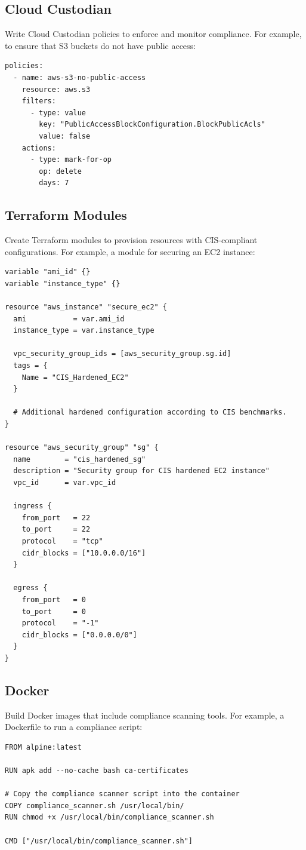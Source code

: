\documentclass[12pt]{article}
\begin{document}
\subsection{Cloud Custodian}
Write Cloud Custodian policies to enforce and monitor compliance. For example, to ensure that S3 buckets do not have public access:
\begin{verbatim}
policies:
  - name: aws-s3-no-public-access
    resource: aws.s3
    filters:
      - type: value
        key: "PublicAccessBlockConfiguration.BlockPublicAcls"
        value: false
    actions:
      - type: mark-for-op
        op: delete
        days: 7
\end{verbatim}

\subsection{Terraform Modules}
Create Terraform modules to provision resources with CIS-compliant configurations. For example, a module for securing an EC2 instance:
\begin{verbatim}
variable "ami_id" {}
variable "instance_type" {}

resource "aws_instance" "secure_ec2" {
  ami           = var.ami_id
  instance_type = var.instance_type

  vpc_security_group_ids = [aws_security_group.sg.id]
  tags = {
    Name = "CIS_Hardened_EC2"
  }

  # Additional hardened configuration according to CIS benchmarks.
}

resource "aws_security_group" "sg" {
  name        = "cis_hardened_sg"
  description = "Security group for CIS hardened EC2 instance"
  vpc_id      = var.vpc_id

  ingress {
    from_port   = 22
    to_port     = 22
    protocol    = "tcp"
    cidr_blocks = ["10.0.0.0/16"]
  }

  egress {
    from_port   = 0
    to_port     = 0
    protocol    = "-1"
    cidr_blocks = ["0.0.0.0/0"]
  }
}
\end{verbatim}

\subsection{Docker}
Build Docker images that include compliance scanning tools. For example, a Dockerfile to run a compliance script:
\begin{verbatim}
FROM alpine:latest

RUN apk add --no-cache bash ca-certificates

# Copy the compliance scanner script into the container
COPY compliance_scanner.sh /usr/local/bin/
RUN chmod +x /usr/local/bin/compliance_scanner.sh

CMD ["/usr/local/bin/compliance_scanner.sh"]
\end{verbatim}
\end{document}
